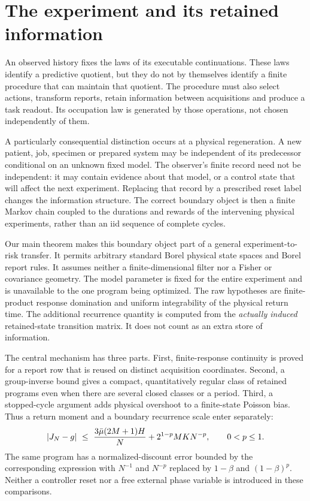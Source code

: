 \section{The experiment and its retained information}\label{sec:intro}
An observed history fixes the laws of its executable continuations. These laws identify a predictive quotient, but they do not by themselves identify a finite procedure that can maintain that quotient. The procedure must also select actions, transform reports, retain information between acquisitions and produce a task readout. Its occupation law is generated by those operations, not chosen independently of them.

A particularly consequential distinction occurs at a physical regeneration. A new patient, job, specimen or prepared system may be independent of its predecessor conditional on an unknown fixed model. The observer's finite record need not be independent: it may contain evidence about that model, or a control state that will affect the next experiment. Replacing that record by a prescribed reset label changes the information structure. The correct boundary object is then a finite Markov chain coupled to the durations and rewards of the intervening physical experiments, rather than an iid sequence of complete cycles.

Our main theorem makes this boundary object part of a general experiment-to-risk transfer. It permits arbitrary standard Borel physical state spaces and Borel report rules. It assumes neither a finite-dimensional filter nor a Fisher or covariance geometry. The model parameter is fixed for the entire experiment and is unavailable to the one program being optimized. The raw hypotheses are finite-product response domination and uniform integrability of the physical return time. The additional recurrence quantity is computed from the \emph{actually induced} retained-state transition matrix. It does not count as an extra store of information.

The central mechanism has three parts. First, finite-response continuity is proved for a report row that is reused on distinct acquisition coordinates. Second, a group-inverse bound gives a compact, quantitatively regular class of retained programs even when there are several closed classes or a period. Third, a stopped-cycle argument adds physical overshoot to a finite-state Poisson bias. Thus a return moment and a boundary recurrence scale enter separately:
\begin{equation}\label{eq:intro-rate}
 |J_N-g|\ \le\ {3\bar\mu(2M+1)H\over N}
       +2^{1-p}MK N^{-p},\qquad 0<p\le1.
\end{equation}
The same program has a normalized-discount error bounded by the corresponding expression with $N^{-1}$ and $N^{-p}$ replaced by $1-\beta$ and $(1-\beta)^p$. Neither a controller reset nor a free external phase variable is introduced in these comparisons.

